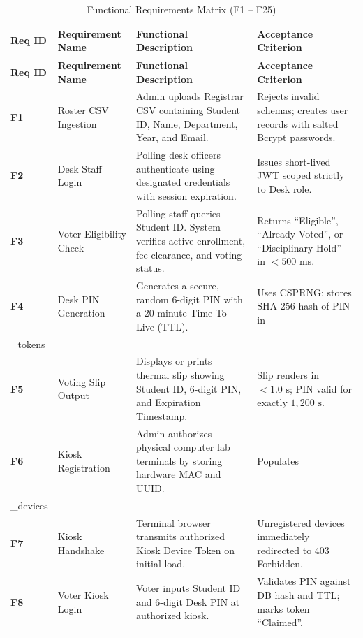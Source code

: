 \documentclass[12pt,a4paper,oneside]{report}
\begin{document}
\begin{longtable}{p{1.8cm} p{4.2cm} p{4.8cm} p{3.2cm}}
    \caption{Functional Requirements Matrix (F1 -- F25)} \label{tab:fr_matrix} \\
    \toprule
    \textbf{Req ID} & \textbf{Requirement Name} & \textbf{Functional Description} & \textbf{Acceptance Criterion} \\
    \midrule
    \endfirsthead
    \toprule
    \textbf{Req ID} & \textbf{Requirement Name} & \textbf{Functional Description} & \textbf{Acceptance Criterion} \\
    \midrule
    \endhead
    \bottomrule
    \endfoot
    \textbf{F1} & Roster CSV Ingestion & Admin uploads Registrar CSV containing Student ID, Name, Department, Year, and Email. & Rejects invalid schemas; creates user records with salted Bcrypt passwords. \\
    \textbf{F2} & Desk Staff Login & Polling desk officers authenticate using designated credentials with session expiration. & Issues short-lived JWT scoped strictly to Desk role. \\
    \textbf{F3} & Voter Eligibility Check & Polling staff queries Student ID. System verifies active enrollment, fee clearance, and voting status. & Returns ``Eligible'', ``Already Voted'', or ``Disciplinary Hold'' in $<500\text{ ms}$. \\
    \textbf{F4} & Desk PIN Generation & Generates a secure, random 6-digit PIN with a 20-minute Time-To-Live (TTL). & Uses CSPRNG; stores SHA-256 hash of PIN in \texttt{voting\\\_tokens}. \\
    \textbf{F5} & Voting Slip Output & Displays or prints thermal slip showing Student ID, 6-digit PIN, and Expiration Timestamp. & Slip renders in $<1.0\text{ s}$; PIN valid for exactly $1,200\text{ s}$. \\
    \textbf{F6} & Kiosk Registration & Admin authorizes physical computer lab terminals by storing hardware MAC and UUID. & Populates \texttt{kiosk\\\_devices} table with active flag. \\
    \textbf{F7} & Kiosk Handshake & Terminal browser transmits authorized Kiosk Device Token on initial load. & Unregistered devices immediately redirected to 403 Forbidden. \\
    \textbf{F8} & Voter Kiosk Login & Voter inputs Student ID and 6-digit Desk PIN at authorized kiosk. & Validates PIN against DB hash and TTL; marks token ``Claimed''. \\

\end{longtable}
\end{document}

